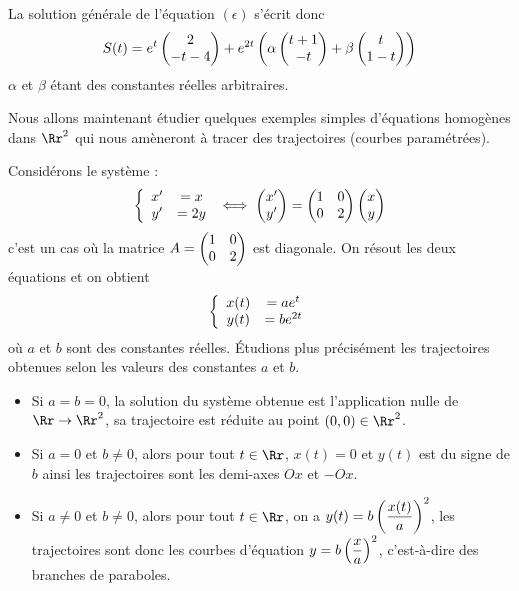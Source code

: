 \documentclass[class=report,crop=false]{standalone}
\begin{document}
\begin{exemple}
La solution générale de l'équation $(\epsilon)$ s'écrit donc
$$S(t)=e^t\left(\begin{matrix}2\cr -t-4\end{matrix}\right)+{e^{2t}\left(\alpha\left(\begin{matrix}t+1\cr -t\end{matrix}\right)+\beta\left(\begin{matrix}t\cr 1-t\end{matrix}\right)\right)}$$
$\alpha$ et $\beta$ étant des constantes réelles arbitraires.  
\end{exemple}

Nous allons maintenant étudier quelques exemples simples d'équations 
homogènes dans $\Rr^2$ qui nous amèneront à tracer des trajectoires (courbes paramétrées).


\begin{exemple}
Considérons le système :
$$\left\{\begin{array}{cc}x'&=x\cr y'&=2y\end{array}\right.
\iff\left(\begin{matrix}x'\cr y'\end{matrix}\right)
=\left(\begin{matrix}1&0\cr 0&2\end{matrix}\right)
\left(\begin{matrix}x\cr y\end{matrix}\right)$$
c'est un cas où la matrice $A=\left(\begin{matrix}1&0\cr 0&2\end{matrix}\right)$ 
est diagonale. On résout les deux équations et on obtient
$$\left\{\begin{array}{cc}x(t)&=ae^t\cr y(t)&=be^{2t}\end{array}\right.$$
où $a$ et $b$ sont des constantes réelles. 
\'Etudions plus précisément les trajectoires obtenues selon les 
valeurs des constantes $a$ et $b$.

\begin{itemize}
  \item Si $a=b=0$, la solution du système obtenue est l'application nulle de 
  $\Rr\rightarrow\Rr^2$, sa trajectoire est réduite au point $(0,0)\in\Rr^2$.

  \item Si $a=0$ et $b\neq 0$, alors pour tout $t\in\Rr$, $x(t)=0$ 
  et $y(t)$ est du signe de $b$ ainsi les trajectoires sont les demi-axes $Ox$ et $-Ox$.
  
  \item Si $a\neq0$ et $b\neq0$, alors pour tout $t\in\Rr$, on a 
$\displaystyle y(t)=b\left({x(t)}\over{a}\right)^2$, 
les trajectoires sont donc les courbes d'équation 
$\displaystyle y=b\left({x}\over{a}\right)^2$, c'est-à-dire des branches de paraboles. 
\end{itemize}
\end{exemple}
 
\end{document}
